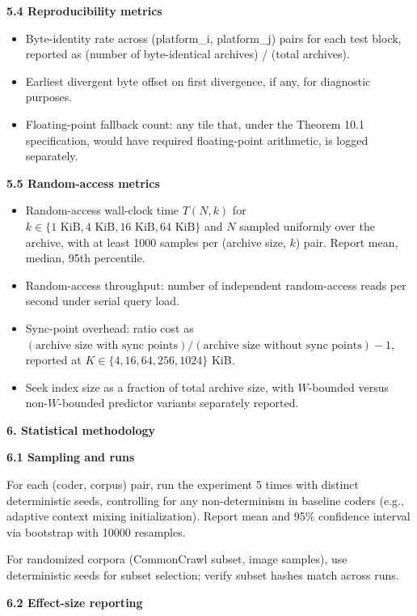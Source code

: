 \documentclass[
]{article}
\begin{document}
\textbf{5.4 Reproducibility metrics}

\begin{itemize}
\item
  Byte-identity rate across (platform\_i, platform\_j) pairs for each
  test block, reported as (number of byte-identical archives) / (total
  archives).
\item
  Earliest divergent byte offset on first divergence, if any, for
  diagnostic purposes.
\item
  Floating-point fallback count: any tile that, under the Theorem 10.1
  specification, would have required floating-point arithmetic, is
  logged separately.
\end{itemize}

\textbf{5.5 Random-access metrics}

\begin{itemize}
\item
  Random-access wall-clock time $T(N, k)$ for
  $k \in \{1 \text{ KiB}, 4 \text{ KiB}, 16 \text{ KiB}, 64 \text{ KiB}\}$
  and $N$ sampled uniformly over the archive, with at least 1000
  samples per (archive size, $k$) pair. Report mean, median, 95th
  percentile.
\item
  Random-access throughput: number of independent random-access
  reads per second under serial query load.
\item
  Sync-point overhead: ratio cost as
  $(\text{archive size with sync points}) / (\text{archive size without sync points}) - 1$,
  reported at $K \in \{4, 16, 64, 256, 1024\}$ KiB.
\item
  Seek index size as a fraction of total archive size, with
  $W$-bounded versus non-$W$-bounded predictor variants separately
  reported.
\end{itemize}

\textbf{6. Statistical methodology}

\textbf{6.1 Sampling and runs}

For each (coder, corpus) pair, run the experiment 5 times with distinct
deterministic seeds, controlling for any non-determinism in baseline
coders (e.g., adaptive context mixing initialization). Report mean and
95\% confidence interval via bootstrap with 10000 resamples.

For randomized corpora (CommonCrawl subset, image samples), use
deterministic seeds for subset selection; verify subset hashes match
across runs.

\textbf{6.2 Effect-size reporting}
\end{document}

